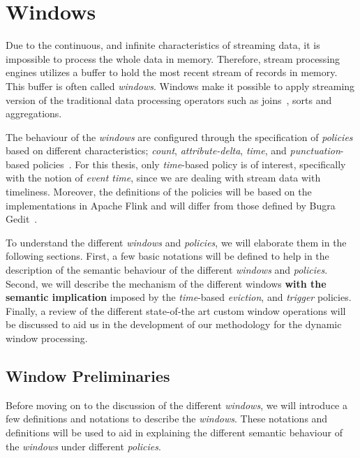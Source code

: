 \chapter{Windows}
\label{chap:windows}

Due to the continuous, and infinite characteristics of streaming data, 
it is impossible to process the whole data in memory. Therefore, 
stream processing engines utilizes a buffer to hold the most recent stream of 
records in memory. This buffer is often called \emph{windows}. Windows make it 
possible to apply streaming version of the traditional data processing operators such
as joins~\cite{grubjoin}, sorts and aggregations. 

The behaviour of the \emph{windows} are configured through the specification of \emph{policies}
based on different characteristics; \emph{count}, \emph{attribute-delta}, \emph{time}, and
\emph{punctuation}-based policies~\cite{generic_window_sem}. For this thesis, only 
\emph{time}-based policy is of interest, specifically with the notion of \emph{event time},
since we are dealing with stream data with 
timeliness. Moreover, the definitions of the policies will be based on the 
implementations in Apache Flink and will differ from those defined by 
Bugra Gedit~\cite{generic_window_sem}. 


To understand the different \emph{windows} and \emph{policies}, we will elaborate them 
in the following sections. First, a few basic notations will be defined to 
help in the description of the semantic behaviour of the different 
\emph{windows} and \emph{policies}. Second, we will describe the mechanism of the 
different windows \textbf{with the semantic implication} imposed by the 
\emph{time}-based \emph{eviction}, and \emph{trigger} policies. 
Finally, a review of the different state-of-the art custom window operations 
will be discussed to aid us in the development of our methodology for 
the dynamic window processing. 


\section{Window Preliminaries}%
\label{sec:window_notations}

Before moving on to the discussion of the different \emph{windows}, we will introduce a 
few definitions and notations to describe the \emph{windows}. These notations and definitions 
will be used to aid in explaining the different semantic behaviour of the \emph{windows} under 
different \emph{policies}. 

